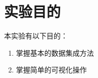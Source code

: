 \section{实验目的}
本实验有以下目的：
\begin{enumerate}
    \item 掌握基本的数据集成方法
    \item 掌握简单的可视化操作
\end{enumerate}
